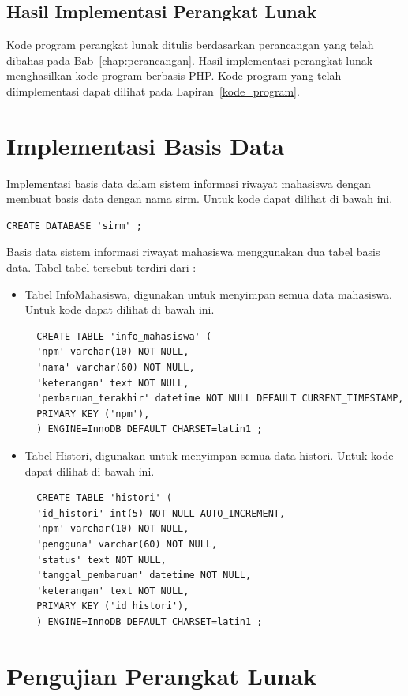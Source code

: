 \subsection{Hasil Implementasi Perangkat Lunak}
\label{sec:hasilimplementasi}

Kode program perangkat lunak ditulis berdasarkan perancangan yang telah dibahas
pada Bab~\ref{chap:perancangan}. Hasil implementasi perangkat lunak
menghasilkan kode program berbasis PHP. Kode program yang telah diimplementasi
dapat dilihat pada Lapiran~\ref{kode_program}.

\section{Implementasi Basis Data}
\label{sec:implementasibasisdata}

Implementasi basis data dalam sistem informasi riwayat mahasiswa
dengan membuat basis data dengan nama sirm. Untuk kode dapat dilihat di bawah
ini.
\begin{lstlisting}
CREATE DATABASE 'sirm' ;
\end{lstlisting}

Basis data sistem informasi riwayat mahasiswa menggunakan dua tabel basis data.
Tabel-tabel tersebut terdiri dari :
\begin{itemize}
  \item Tabel InfoMahasiswa, digunakan untuk menyimpan semua data mahasiswa.
  Untuk kode dapat dilihat di bawah ini.
  \begin{lstlisting}
  CREATE TABLE 'info_mahasiswa' (
  'npm' varchar(10) NOT NULL,
  'nama' varchar(60) NOT NULL,
  'keterangan' text NOT NULL,
  'pembaruan_terakhir' datetime NOT NULL DEFAULT CURRENT_TIMESTAMP,
  PRIMARY KEY ('npm'),
  ) ENGINE=InnoDB DEFAULT CHARSET=latin1 ;
  \end{lstlisting}
  \item Tabel Histori, digunakan untuk menyimpan semua data histori. Untuk kode
  dapat dilihat di bawah ini.
  \begin{lstlisting}
  CREATE TABLE 'histori' (
  'id_histori' int(5) NOT NULL AUTO_INCREMENT,
  'npm' varchar(10) NOT NULL,
  'pengguna' varchar(60) NOT NULL,
  'status' text NOT NULL,
  'tanggal_pembaruan' datetime NOT NULL,
  'keterangan' text NOT NULL,
  PRIMARY KEY ('id_histori'),
  ) ENGINE=InnoDB DEFAULT CHARSET=latin1 ;
  \end{lstlisting}
\end{itemize}

\section{Pengujian Perangkat Lunak}
\label{sec:pengujianperangkatlunak}

